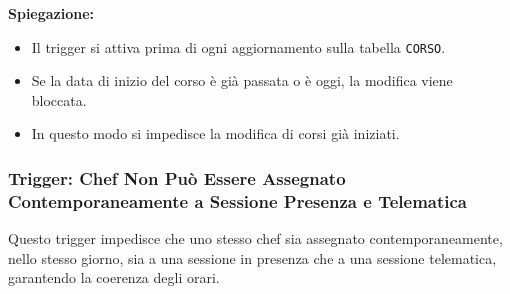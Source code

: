 \textbf{Spiegazione:}
\begin{itemize}
        \item Il trigger si attiva prima di ogni aggiornamento sulla tabella \texttt{CORSO}.
        \item Se la data di inizio del corso è già passata o è oggi, la modifica viene bloccata.
        \item In questo modo si impedisce la modifica di corsi già iniziati.
\end{itemize}
\subsubsection{Trigger: Chef Non Può Essere Assegnato Contemporaneamente a Sessione Presenza e Telematica}

Questo trigger impedisce che uno stesso chef sia assegnato contemporaneamente, nello stesso giorno, sia a una sessione in presenza che a una sessione telematica, garantendo la coerenza degli orari.

